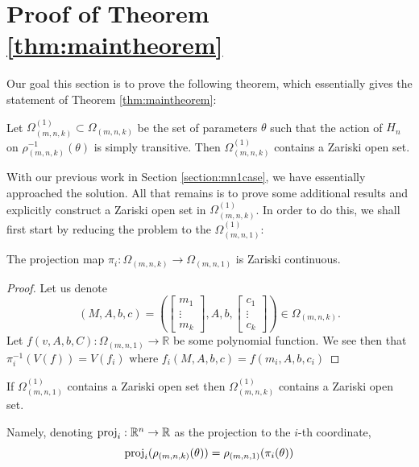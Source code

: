 \documentclass[11pt,letterpaper]{amsart}
\begin{document}
\section{Proof of Theorem \ref{thm:maintheorem}}\label{section:genericity}
Our goal this section is to prove the following theorem, which essentially gives the statement of Theorem \ref{thm:maintheorem}:
\begin{theorem}\label{thm:ZariskiOpenSet}
    Let $\Omega^{(1)}_{(m, n, k)}\subset \Omega_{(m, n, k)}$ be the set of parameters $\theta$ such that the action of $H_n$ on $\rho_{(m,n,k)}^{-1}(\theta)$ is simply transitive. Then $\Omega^{(1)}_{(m, n, k)}$ contains a Zariski open set.
\end{theorem}

With our previous work in Section \ref{section:mn1case}, we have essentially approached the solution. All that remains is to prove some additional results and explicitly construct a Zariski open set in $\Omega^{(1)}_{(m,n,k)}$. In order to do this, we shall first start by reducing the problem to the $\Omega^{(1)}_{(m,n,1)}$:
\begin{lemma}\label{lem:projzarcont}
    The projection map $\pi_i: \Omega_{(m,n,k)}\rightarrow\Omega_{(m,n,1)}$ is Zariski continuous.
\end{lemma}
\begin{proof}
    Let us denote
    $$
    (M, A, b, c) = \left(\begin{bmatrix}
        m_1 \\ \vdots\\ m_k
    \end{bmatrix}, A, b, \begin{bmatrix}
        c_1 \\ \vdots\\ c_k
    \end{bmatrix}\right)\in \Omega_{(m,n,k)}.
    $$
    Let $f(v, A, b, C):\Omega_{(m,n,1)}\rightarrow\mathbb{R}$ be some polynomial function. We see then that $\pi_i^{-1}(V(f))=V(f_i)$ where $f_i(M, A, b, c) = f(m_i, A, b, c_i)$
\end{proof}
\begin{proposition}\label{prop:genericityreductionprop}
    If $\Omega^{(1)}_{(m, n, 1)}$ contains a Zariski open set then $\Omega^{(1)}_{(m, n, k)}$ contains a Zariski open set.
\end{proposition}
Namely, denoting $\textup{proj}_i:\mathbb{R}^{n}\rightarrow\mathbb{R}$ as the projection to the $i$-th coordinate,
$$
\textup{proj}_i(\rho_{(m,n,k)}(\theta)) = \rho_{(m,n,1)}(\pi_i(\theta))
$$
\end{document}
